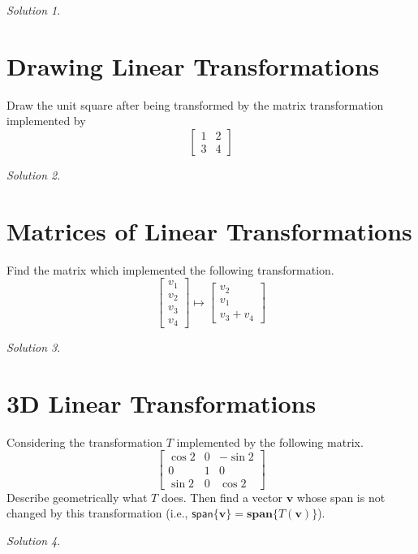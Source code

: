 \documentclass{article}
\theoremstyle{remark}
\newtheorem*{solution}{Solution}
\begin{document}
\medskip

\begin{solution}
\end{solution}

\pagebreak
\section{Drawing Linear Transformations}
Draw the unit square after being transformed by the matrix transformation implemented by
\begin{displaymath}
  \begin{bmatrix}
    1 & 2 \\
    3 & 4
  \end{bmatrix}
\end{displaymath}

\medskip

\begin{solution}
\end{solution}

\pagebreak
\section{Matrices of Linear Transformations}
Find the matrix which implemented the following transformation.
\begin{displaymath}
  \begin{bmatrix}
    v_1 \\ v_2 \\ v_3 \\ v_4
  \end{bmatrix}
  \mapsto
  \begin{bmatrix}
    v_2 \\ v_1 \\ v_3 + v_4
  \end{bmatrix}
\end{displaymath}
\medskip

\begin{solution}
\end{solution}

\pagebreak
\section{3D Linear Transformations}
Considering the transformation $T$ implemented by the following matrix.
\begin{displaymath}
  \begin{bmatrix}
    \cos2 & 0 & -\sin2 \\
    0 & 1 & 0 \\
    \sin2 & 0 & \cos2
  \end{bmatrix}
\end{displaymath}
Describe geometrically what $T$ does.
Then find a vector $\mathbf v$ whose span is not changed by this transformation (i.e., $\mathsf{span}\{\mathbf v\} = \mathbf{span}\{T(\mathbf v)\}$).

\medskip

\begin{solution}
\end{solution}
\end{document}
